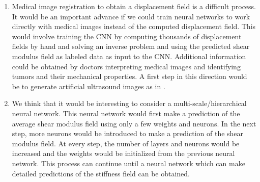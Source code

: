 \documentclass[12pt]{article}
\begin{document}
\begin{enumerate}
\item{Medical image registration to obtain a displacement field is a difficult process. It would be an important advance if we could train neural networks to work directly with medical images instead of the computed displacement field. This would involve training the CNN by computing thousands of displacement fields by hand and solving an inverse problem and using the predicted shear modulus field as labeled data as input to the CNN. Additional information could be obtained by doctors interpreting medical images and identifying tumors and their mechanical properties. A first step in this direction would be to generate artificial ultrasound images as in \cite{paper:doyley}.}
\item{We think that it would be interesting to consider a multi-scale/hierarchical neural network. This neural network would first make a prediction of the average shear modulus field using only a few weights and neurons. In the next step, more neurons would be introduced to make a prediction of the shear modulus field. At every step, the number of layers and neurons would be increased and the weights would be initialized from the previous neural network. This process can continue until a neural network which can make detailed predictions of the stiffness field can be obtained.}

\end{enumerate}
\end{document}
